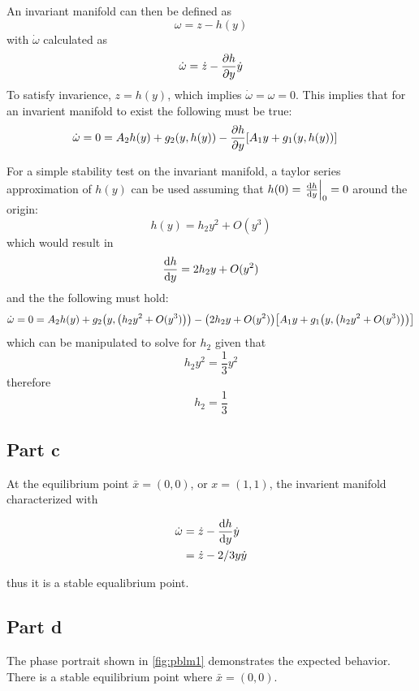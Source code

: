 \documentclass[letter]{article}
\begin{document}
An invariant manifold can then be defined as $$\omega = z - h(y)$$ with $\dot{\omega}$ calculated as $$\dot{\omega} = \dot{z} - \pdv{h}{y} \dot{y}$$
To satisfy invarience, $z = h(y)$, which implies $\dot{\omega} = \omega = 0$. This implies that for an invarient manifold to exist the following must be true:
\begin{align}
	\dot{\omega} = 0
	&= A_2 h(y) + g_2(y,h(y)) - \pdv{h}{y} \qty[A_1 y + g_1(y,h(y))]
\end{align}

For a simple stability test on the invariant manifold, a taylor series approximation of $h(y)$ can be used assuming that $h(0) = \eval{\dv{h}{y}}_0 = 0$ around the origin:
\begin{equation}
	h(y) = h_2 y^2 + O(y^3)
\end{equation}
which would result in
\begin{equation}
	\dv{h}{y} = 2h_2 y + O(y^2)
\end{equation}
and the the following must hold:
\begin{equation}
	\dot{\omega} = 0
	= A_2 h(y) + g_2\qty(y,\qty(h_2 y^2 + O(y^3))) - \qty(2h_2 y + O(y^2)) \qty[A_1 y + g_1\qty(y,\qty(h_2 y^2 + O(y^3)))]
\end{equation}
which can be manipulated to solve for $h_2$ given that $$h_2  y^2 = \frac{1}{3} y^2$$ therefore
\begin{equation}
	h_2 = \frac{1}{3}
\end{equation}

\newpage
\subsection{Part c}
At the equilibrium point $\bar{x} = (0,0)$, or $x = (1,1)$, the invarient manifold characterized with 

\begin{align}
	\dot{\omega} &= \dot{z} - \dv{h}{y} \dot{y}\\
	&= \dot{z} - 2/3 y \dot{y}
\end{align}

thus it is a stable equalibrium point.


\subsection{Part d}

The phase portrait shown in \figurename \ref{fig:pblm1} demonstrates the expected behavior. There is a stable equilibrium point where $\bar{x} = (0,0)$.
\end{document}
